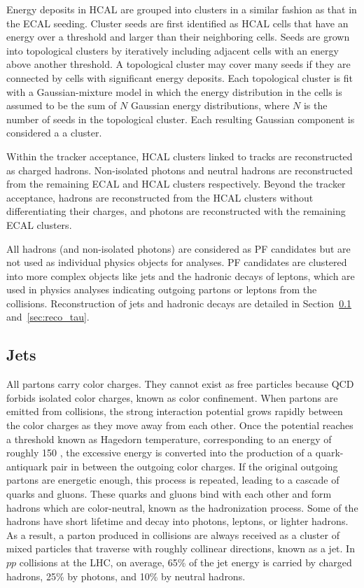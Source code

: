 Energy deposits in HCAL are grouped into clusters in a similar fashion as that in the ECAL seeding.
Cluster seeds are first identified as HCAL cells that have an energy over a threshold and larger than their neighboring cells.
Seeds are grown into topological clusters by iteratively including adjacent cells with an energy above another threshold.
A topological cluster may cover many seeds if they are connected by cells with significant energy deposits.
Each topological cluster is fit with a Gaussian-mixture model in which the energy distribution in the cells is assumed to be 
the sum of $N$ Gaussian energy distributions, where $N$ is the number of seeds in the topological cluster.
Each resulting Gaussian component is considered a a cluster.

Within the tracker acceptance, HCAL clusters linked to tracks are reconstructed as charged hadrons. 
Non-isolated photons and neutral hadrons are reconstructed from the remaining ECAL and HCAL clusters respectively.
Beyond the tracker acceptance, hadrons are reconstructed from the HCAL clusters without differentiating their charges,
and photons are reconstructed with the remaining ECAL clusters.

All hadrons (and non-isolated photons) are considered as PF candidates but are not used as individual physics objects for analyses.
PF candidates are clustered into more complex objects like jets and the hadronic decays of \tau{} leptons,
which are used in physics analyses indicating outgoing partons or \tau{} leptons from the collisions.  
Reconstruction of jets and hadronic \tau{} decays are detailed in Section~\ref{sec:reco_jet} and~\ref{sec:reco_tau}.


\subsection{Jets}\label{sec:reco_jet}

All partons carry color charges. 
They cannot exist as free particles because QCD forbids isolated color charges, known as color confinement.
When partons are emitted from collisions, the strong interaction potential grows rapidly between the color charges as they move away from each other.
Once the potential reaches a threshold known as Hagedorn temperature, corresponding to an energy of roughly 150 \MeV,
the excessive energy is converted into the production of a quark-antiquark pair in between the outgoing color charges. 
If the original outgoing partons are energetic enough, this process is repeated, leading to a cascade of quarks and gluons.
These quarks and gluons bind with each other and form hadrons which are color-neutral, known as the hadronization process.
Some of the hadrons have short lifetime and decay into photons, leptons, or lighter hadrons.
As a result, a parton produced in collisions are always received as a cluster of mixed particles that traverse with roughly collinear directions, known as a jet.
In $pp$ collisions at the LHC, on average, 65\% of the jet energy is carried by charged hadrons, 25\% by photons, and 10\% by neutral hadrons.

